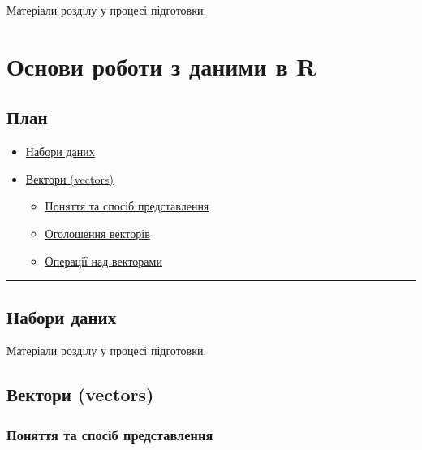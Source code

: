 \documentclass[
]{book}
\providecommand{\tightlist}{%
  \setlength{\itemsep}{0pt}\setlength{\parskip}{0pt}}
\begin{document}
Матеріали розділу у процесі підготовки.

\hypertarget{chapter3}{%
\chapter{Основи роботи з даними в R}\label{chapter3}}

\hypertarget{ux43fux43bux430ux43d-2}{%
\section*{План}\label{ux43fux43bux430ux43d-2}}

\begin{itemize}
\tightlist
\item
  \protect\hyperlink{chapter31}{Набори даних}
\item
  \protect\hyperlink{chapter32}{Вектори (vectors)}

  \begin{itemize}
  \tightlist
  \item
    \protect\hyperlink{chapter321}{Поняття та спосіб представлення}
  \item
    \protect\hyperlink{chapter322}{Оголошення векторів}
  \item
    \protect\hyperlink{chapter323}{Операції над векторами}
  \end{itemize}
\end{itemize}

\begin{center}\rule{0.5\linewidth}{0.5pt}\end{center}

\hypertarget{chapter31}{%
\section{Набори даних}\label{chapter31}}

Матеріали розділу у процесі підготовки.

\hypertarget{chapter32}{%
\section{Вектори (vectors)}\label{chapter32}}

\hypertarget{chapter321}{%
\subsection{Поняття та спосіб представлення}\label{chapter321}}
\end{document}
